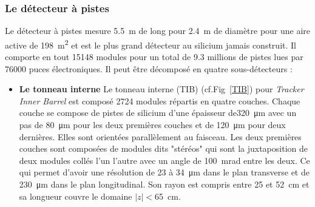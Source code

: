 \subsubsection{Le détecteur à pistes}
Le détecteur à pistes mesure \SI{5.5}{\meter} de long pour \SI{2.4}{\meter} de diamètre pour une aire active de \SI{198}{\square\meter} et est le plus grand détecteur au silicium jamais construit. Il comporte en tout \num{15148} modules pour un total de \num{9.3} millions de pistes lues par \num{76000} puces électroniques. Il peut être décomposé en quatre sous-détecteurs :

\begin{itemize}[label=$\bullet$]
\item \textbf{Le tonneau interne} Le tonneau interne (TIB) (cf.Fig~\ref{TIB}) pour  \textit{Tracker Inner Barrel} est composé \num{2724} modules répartis en quatre couches. Chaque couche se compose de pistes de silicium d'une épaisseur de\SI{320}{\micro\meter} avec un pas de \SI{80}{\micro\meter} pour les deux premières couches et de \SI{120}{\micro\meter} pour deux dernières. Elles sont orientées parallèlement au faisceau. Les deux premières couches sont composées de modules dits "stéréos" qui sont la juxtaposition de deux modules collés l'un l'autre avec un angle de \SI{100}{\milli\radian} entre les deux. Ce qui permet d'avoir une résolution de \num{23} à \SI{34}{\micro\m} dans le plan transverse et de \SI{230}{\micro\meter} dans le plan longitudinal. Son rayon est compris entre \num{25} et \SI{52}{\centi\meter} et sa longueur couvre le domaine $|z|<$\SI{65}{\centi\meter}.


\end{itemize}

